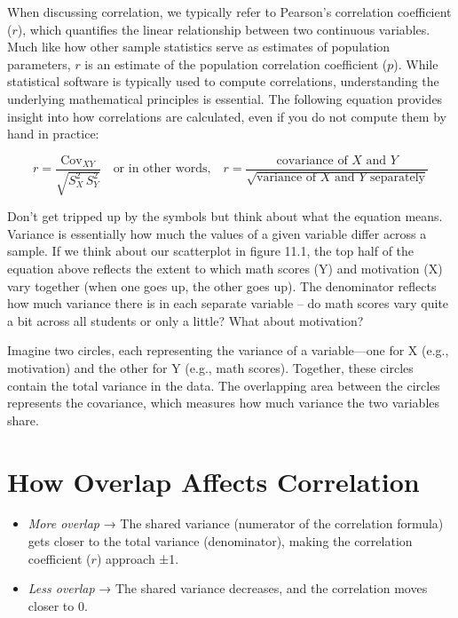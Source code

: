 \documentclass[
  letterpaper,
  DIV=11,
  numbers=noendperiod]{scrreprt}
\begin{document}
When discussing correlation, we typically refer to Pearson's correlation
coefficient (\(r\)), which quantifies the linear relationship between
two continuous variables. Much like how other sample statistics serve as
estimates of population parameters, \(r\) is an estimate of the
population correlation coefficient (\(p\)). While statistical software
is typically used to compute correlations, understanding the underlying
mathematical principles is essential. The following equation provides
insight into how correlations are calculated, even if you do not compute
them by hand in practice:

\[
r = \frac{\mathrm{Cov}_{XY}}{\sqrt{S_X^2 \, S_Y^2}}
\quad \text{or in other words,} \quad
r = \frac{\text{covariance of } X \text{ and } Y}{\sqrt{\text{variance of } X \text{ and } Y \text{ separately}}}
\]

Don't get tripped up by the symbols but think about what the equation
means. Variance is essentially how much the values of a given variable
differ across a sample. If we think about our scatterplot in figure
11.1, the top half of the equation above reflects the extent to which
math scores (Y) and motivation (X) vary together (when one goes up, the
other goes up). The denominator reflects how much variance there is in
each separate variable -- do math scores vary quite a bit across all
students or only a little? What about motivation?

Imagine two circles, each representing the variance of a variable---one
for X (e.g., motivation) and the other for Y (e.g., math scores).
Together, these circles contain the total variance in the data. The
overlapping area between the circles represents the covariance, which
measures how much variance the two variables share.

\section{How Overlap Affects
Correlation}\label{how-overlap-affects-correlation}

\begin{itemize}
\item
  \emph{More overlap} → The shared variance (numerator of the
  correlation formula) gets closer to the total variance (denominator),
  making the correlation coefficient (\(r\)) approach ±1.
\item
  \emph{Less overlap} → The shared variance decreases, and the
  correlation moves closer to 0.
\end{itemize}
\end{document}
